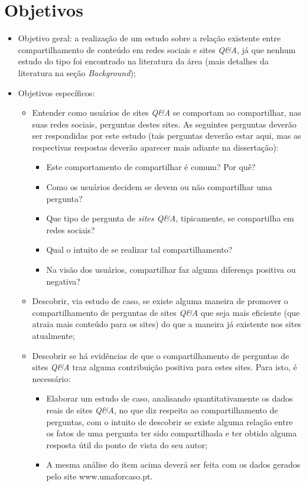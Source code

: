     \section{Objetivos}
\begin{itemize}
    \item Objetivo geral: a realização de um estudo sobre a relação existente entre compartilhamento de conteúdo em redes sociais e sites \textit{Q\&A}, já que nenhum estudo do tipo foi encontrado na literatura da área (mais detalhes da literatura na seção \textit{Background});
    \item Objetivos específicos:
    \begin{itemize}
        \item Entender como usuários de sites \textit{Q\&A} se comportam ao compartilhar, nas suas redes sociais, perguntas destes sites. As seguintes perguntas deverão ser respondidas por este estudo (tais perguntas deverão estar aqui, mas as respectivas respostas deverão aparecer mais adiante na dissertação):
            \begin{itemize}
                \item Este comportamento de compartilhar é comum? Por quê?
                \item Como os usuários decidem se devem ou não compartilhar uma pergunta?
                \item Que tipo de pergunta de \textit{sites Q\&A}, tipicamente, se compartilha em redes sociais?
                \item Qual o intuito de se realizar tal compartilhamento?
                \item Na visão dos usuários, compartilhar faz alguma diferença positiva ou negativa?
            \end{itemize}
        
        \item Descobrir, via estudo de caso, se existe alguma maneira de promover o compartilhamento de perguntas de sites \textit{Q\&A} que seja mais eficiente (que atraia mais conteúdo para os sites) do que a maneira já existente nos sites atualmente;
      
        \item Descobrir se há evidências de que o compartilhamento de perguntas de sites \textit{Q\&A} traz alguma contribuição positiva para estes sites. Para isto, é necessário:
            \begin{itemize}
                \item Elaborar um estudo de caso, analisando quantitativamente os dados reais de sites \textit{Q\&A}, no que diz respeito ao compartilhamento de perguntas, com o intuito de descobrir se existe alguma relação entre os fatos de uma pergunta ter sido compartilhada e ter obtido alguma resposta útil do ponto de vista do seu autor;
                \item A mesma análise do item acima deverá ser feita com os dados gerados pelo site www.umaforcaso.pt.
            \end{itemize}
    \end{itemize}
\end{itemize}

